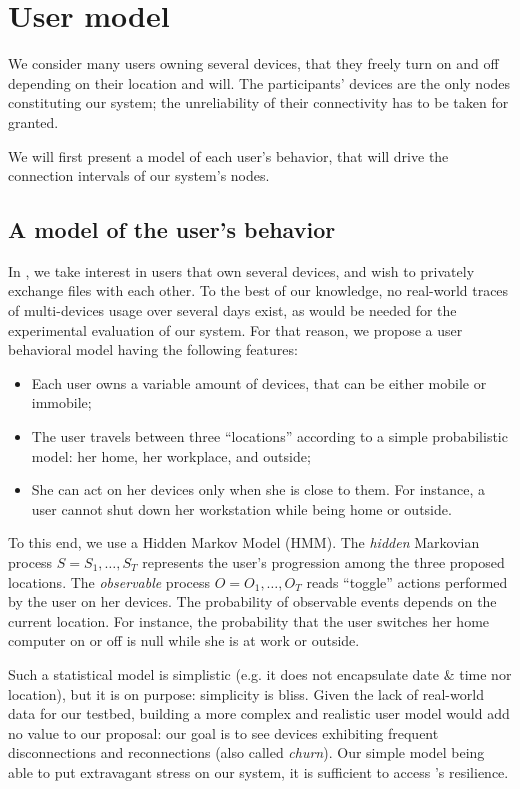 \section{User model} 
\label{sec:user_model}

We consider many users owning several devices, that they freely turn on and off depending on their location and will.
The participants' devices are the only nodes constituting our system; the unreliability of their connectivity has to be taken for granted.

We will first present a model of each user's behavior, that will drive the connection intervals of our system's nodes.

\subsection{A model of the user's behavior}
\label{sub:a_model_of_the_user_s_behavior}

In \name, we take interest in users that own several devices, and wish to privately exchange files with each other.
To the best of our knowledge, no real-world traces of multi-devices usage over several days exist, as would be needed for the experimental evaluation of our system.
For that reason, we propose a user behavioral model having the following features:

\begin{itemize}
	\item Each user owns a variable amount of devices, that can be either mobile or immobile;
	\item The user travels between three ``locations'' according to a simple probabilistic model: her home, her workplace, and outside;
	\item She can act on her devices only when she is close to them. For instance, a user cannot shut down her workstation while being home or outside.
\end{itemize}

To this end, we use a Hidden Markov Model (HMM). 
The \emph{hidden} Markovian process $S=S_1,\dots,S_T$ represents the user's progression among the three proposed locations.
The \emph{observable} process $O=O_1,\dots,O_T$ reads ``toggle'' actions performed by the user on her devices. The probability of observable events depends on the current location.
For instance, the probability that the user switches her home computer on or off is null while she is at work or outside.

Such a statistical model is simplistic (e.g. it does not encapsulate date \& time nor location), but it is on purpose: simplicity is bliss.
Given the lack of real-world data for our testbed, building a more complex and realistic user model would add no value to our proposal: 
our goal is to see devices exhibiting frequent disconnections and reconnections (also called \emph{churn}).
Our simple model being able to put extravagant stress on our system, it is sufficient to access \name's resilience.

